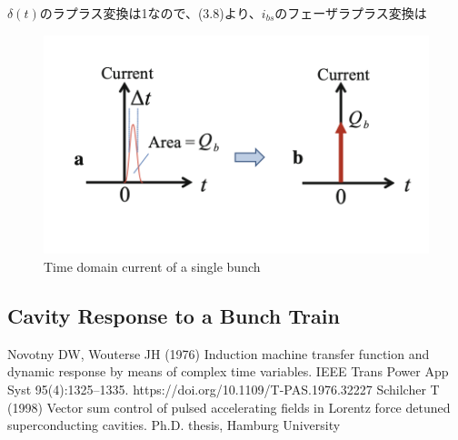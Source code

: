 \documentclass[book]{jlreq}
\begin{document}
$\delta (t)$のラプラス変換は1なので、(3.8)より、$i_{bs}$のフェーザラプラス変換は

%
\begin{figure}[hbt]
    \begin{center}
      \includegraphics[width=12cm,clip]{figs/Fig3.11.png}
      \caption{Time domain current of a single bunch}
     \label{Fig3.11}
    \end{center}
\end{figure}

\subsection{Cavity Response to a Bunch Train}

\begin{thebibliography}{99}
    Novotny DW, Wouterse JH (1976) Induction machine transfer function and dynamic response by means of complex time variables. IEEE Trans Power App Syst 95(4):1325–1335. https://doi.org/10.1109/T-PAS.1976.32227
    Schilcher T (1998) Vector sum control of pulsed accelerating fields in Lorentz force detuned superconducting cavities. Ph.D. thesis, Hamburg University
\end{thebibliography}
%
%
\end{document}
